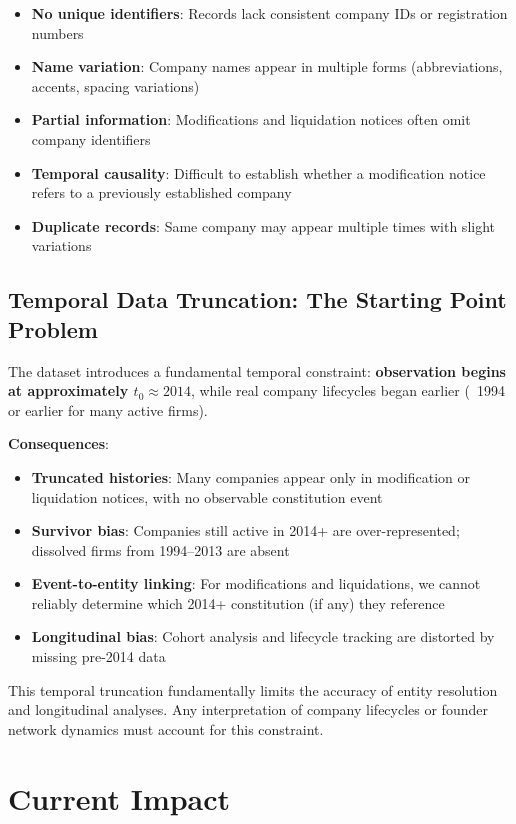 \documentclass[12pt,a4paper]{report}
\begin{document}
\begin{itemize}
    \item \textbf{No unique identifiers}: Records lack consistent company IDs or registration numbers
    \item \textbf{Name variation}: Company names appear in multiple forms (abbreviations, accents, spacing variations)
    \item \textbf{Partial information}: Modifications and liquidation notices often omit company identifiers
    \item \textbf{Temporal causality}: Difficult to establish whether a modification notice refers to a previously established company
    \item \textbf{Duplicate records}: Same company may appear multiple times with slight variations
\end{itemize}

\subsection{Temporal Data Truncation: The Starting Point Problem}

The dataset introduces a fundamental temporal constraint: \textbf{observation begins at approximately $t_0 \approx 2014$}, while real company lifecycles began earlier (~1994 or earlier for many active firms).

\textbf{Consequences}:
\begin{itemize}
    \item \textbf{Truncated histories}: Many companies appear only in modification or liquidation notices, with no observable constitution event
    \item \textbf{Survivor bias}: Companies still active in 2014+ are over-represented; dissolved firms from 1994--2013 are absent
    \item \textbf{Event-to-entity linking}: For modifications and liquidations, we cannot reliably determine which 2014+ constitution (if any) they reference
    \item \textbf{Longitudinal bias}: Cohort analysis and lifecycle tracking are distorted by missing pre-2014 data
\end{itemize}

This temporal truncation fundamentally limits the accuracy of entity resolution and longitudinal analyses. Any interpretation of company lifecycles or founder network dynamics must account for this constraint.

\section{Current Impact}
\end{document}
